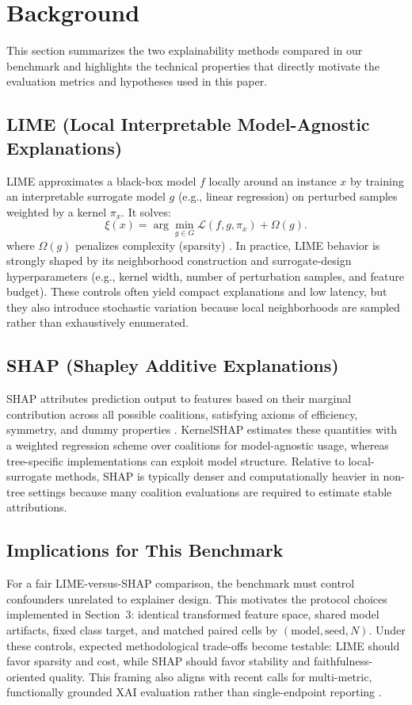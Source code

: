 \documentclass[twoside,11pt]{article}
\begin{document}
\section{Background}
This section summarizes the two explainability methods compared in our
benchmark and highlights the technical properties that directly motivate
the evaluation metrics and hypotheses used in this paper.

\subsection{LIME (Local Interpretable Model-Agnostic Explanations)}

LIME approximates a black-box model \(f\) locally around an instance
\(x\) by training an interpretable surrogate model \(g\) (e.g., linear
regression) on perturbed samples weighted by a kernel \(\pi_x\). It
solves:
\[
\xi(x) = \arg\min_{g \in G} \mathcal{L}(f, g, \pi_x) + \Omega(g).
\]
where \(\Omega(g)\) penalizes complexity (sparsity)
\citep{ribeiro2016why}. In practice, LIME behavior is strongly shaped by
its neighborhood construction and surrogate-design hyperparameters
(e.g., kernel width, number of perturbation samples, and feature budget).
These controls often yield compact explanations and low latency, but
they also introduce stochastic variation because local neighborhoods are
sampled rather than exhaustively enumerated.

\subsection{SHAP (Shapley Additive Explanations)}

SHAP attributes prediction output to features based on their marginal
contribution across all possible coalitions, satisfying axioms of
efficiency, symmetry, and dummy properties
\citep{lundberg2017unified}. KernelSHAP estimates these quantities with
a weighted regression scheme over coalitions for model-agnostic usage,
whereas tree-specific implementations can exploit model structure.
Relative to local-surrogate methods, SHAP is typically denser and
computationally heavier in non-tree settings because many coalition
evaluations are required to estimate stable attributions.

\subsection{Implications for This Benchmark}
For a fair LIME-versus-SHAP comparison, the benchmark must control
confounders unrelated to explainer design. This motivates the protocol
choices implemented in Section~3: identical transformed feature space,
shared model artifacts, fixed class target, and matched paired cells by
\((\mathrm{model}, \mathrm{seed}, N)\). Under these controls, expected
methodological trade-offs become testable: LIME should favor sparsity
and cost, while SHAP should favor stability and faithfulness-oriented
quality. This framing also aligns with recent calls for multi-metric,
functionally grounded XAI evaluation rather than single-endpoint
reporting \citep{pawlicki2024metrics,canha2025benchmark}.
\end{document}
